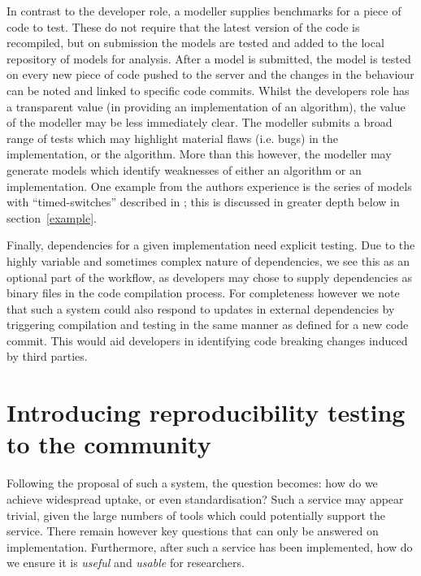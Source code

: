 \documentclass{llncs}
\begin{document}
In contrast to the developer role, a modeller supplies benchmarks for a piece of code 
to test. These do not require that the latest version of the code is recompiled, but 
on submission the models are tested and added to the local repository of models for
analysis. After a model is submitted, the model is tested on every new piece of code
pushed to the server and the changes in the behaviour can be noted and linked to 
specific code commits. Whilst the developers role has a transparent value (in 
providing an implementation of an algorithm), the value of the modeller may be less 
immediately clear. The modeller submits a broad range of tests which may highlight
material flaws (i.e. bugs) in the implementation, or the algorithm. More than this
however, the modeller may generate models which identify weaknesses of either an
algorithm or an implementation. One example from the authors experience is the 
series of models with ``timed-switches'' described in \cite{cook2014}; this is discussed 
in greater depth below in section~\ref{example}.

Finally, dependencies for a given implementation need explicit testing. Due to the
highly variable and sometimes complex nature of dependencies, we see this as an
optional part of the workflow, as developers may chose to supply dependencies as
binary files in the code compilation process. For completeness however we note that 
such a system could also respond to updates in external dependencies by triggering 
compilation and testing in the same manner as defined for a new code commit. This 
would aid developers in identifying code breaking changes induced by third parties.


\section{Introducing reproducibility testing to the community}\label{rollout}

Following the proposal of such a system, the question becomes: how do we achieve 
widespread uptake, or even standardisation? Such a service may appear trivial, given the large numbers of tools which
could potentially support the service. There remain however key questions that
can only be answered on implementation. Furthermore, after such a service has been
implemented, how do we ensure it is \emph{useful} and \emph{usable} for researchers.
\end{document}
